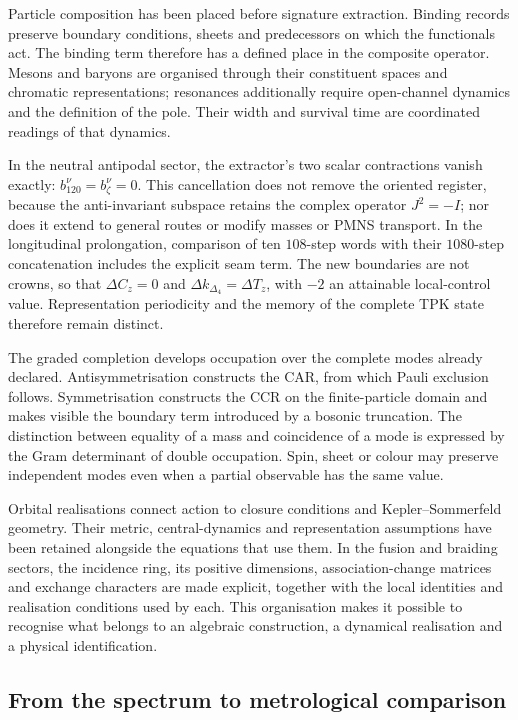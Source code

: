 Particle composition has been placed before signature
extraction. Binding records preserve boundary conditions,
sheets and predecessors on which the functionals act. The binding
term therefore has a defined place in the composite
operator. Mesons and baryons are organised through their constituent
spaces and chromatic representations; resonances
additionally require open-channel dynamics and the definition of the
pole. Their width and survival time are coordinated readings
of that dynamics.

In the neutral antipodal sector, the extractor's two scalar contractions
vanish exactly: \(b_{120}^{\nu}=b_{\zeta}^{\nu}=0\). This cancellation
does not remove the oriented register, because the anti-invariant subspace
retains the complex operator \(J^2=-I\); nor does it extend to general
routes or modify masses or PMNS transport. In the longitudinal
prolongation, comparison of ten \(108\)-step words with their
\(1080\)-step concatenation includes the explicit seam term. The new
boundaries are not crowns, so that
\(\Delta C_z=0\) and \(\Delta k_{\Delta_4}=\Delta T_z\), with \(-2\) an
attainable local-control value. Representation periodicity and the memory
of the complete TPK state therefore remain distinct.

The graded completion develops occupation over the complete
modes already declared. Antisymmetrisation constructs the
CAR, from which Pauli exclusion follows. Symmetrisation
constructs the CCR on the finite-particle domain and makes visible
the boundary term introduced by a bosonic truncation.
The distinction between equality of a mass and coincidence of a mode
is expressed by the Gram determinant of double occupation.
Spin, sheet or colour may preserve independent modes even when
a partial observable has the same value.

Orbital realisations connect action to closure conditions
and Kepler--Sommerfeld geometry. Their metric,
central-dynamics and representation assumptions have been retained alongside the
equations that use them. In the fusion and braiding sectors,
the incidence ring, its positive dimensions,
association-change matrices and exchange characters are made explicit,
together with the local identities and realisation conditions
used by each. This organisation makes it possible to recognise what belongs to
an algebraic construction, a dynamical realisation and a
physical identification.

\subsection{From the spectrum to metrological comparison}

